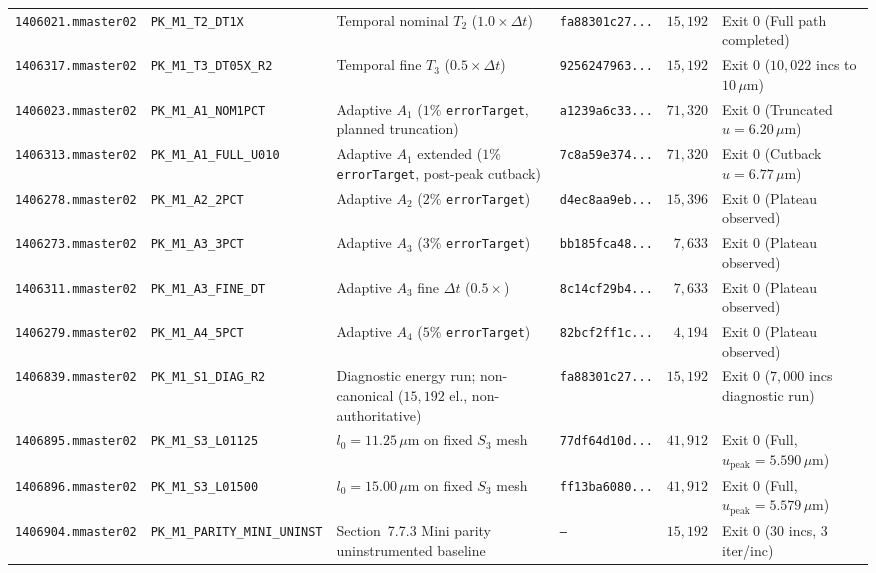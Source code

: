 \begin{table}[htbp]
\begin{tabularx}{\textwidth}{llXlrl}
\texttt{1406021.mmaster02} & \texttt{PK\_M1\_T2\_DT1X} & Temporal nominal $T_2$ ($1.0\times\Delta t$) & \texttt{fa88301c27...} & $15{,}192$ & Exit 0 (Full path completed) \\
\texttt{1406317.mmaster02} & \texttt{PK\_M1\_T3\_DT05X\_R2} & Temporal fine $T_3$ ($0.5\times\Delta t$) & \texttt{9256247963...} & $15{,}192$ & Exit 0 ($10{,}022$ incs to $10\,\mu\text{m}$) \\
\texttt{1406023.mmaster02} & \texttt{PK\_M1\_A1\_NOM1PCT} & Adaptive $A_1$ ($1\%$ \texttt{errorTarget}, planned truncation) & \texttt{a1239a6c33...} & $71{,}320$ & Exit 0 (Truncated $u=6.20\,\mu\text{m}$) \\
\texttt{1406313.mmaster02} & \texttt{PK\_M1\_A1\_FULL\_U010} & Adaptive $A_1$ extended ($1\%$ \texttt{errorTarget}, post-peak cutback) & \texttt{7c8a59e374...} & $71{,}320$ & Exit 0 (Cutback $u=6.77\,\mu\text{m}$) \\
\texttt{1406278.mmaster02} & \texttt{PK\_M1\_A2\_2PCT} & Adaptive $A_2$ ($2\%$ \texttt{errorTarget}) & \texttt{d4ec8aa9eb...} & $15{,}396$ & Exit 0 (Plateau observed) \\
\texttt{1406273.mmaster02} & \texttt{PK\_M1\_A3\_3PCT} & Adaptive $A_3$ ($3\%$ \texttt{errorTarget}) & \texttt{bb185fca48...} & $7{,}633$ & Exit 0 (Plateau observed) \\
\texttt{1406311.mmaster02} & \texttt{PK\_M1\_A3\_FINE\_DT} & Adaptive $A_3$ fine $\Delta t$ ($0.5\times$) & \texttt{8c14cf29b4...} & $7{,}633$ & Exit 0 (Plateau observed) \\
\texttt{1406279.mmaster02} & \texttt{PK\_M1\_A4\_5PCT} & Adaptive $A_4$ ($5\%$ \texttt{errorTarget}) & \texttt{82bcf2ff1c...} & $4{,}194$ & Exit 0 (Plateau observed) \\
\texttt{1406839.mmaster02} & \texttt{PK\_M1\_S1\_DIAG\_R2} & Diagnostic energy run; non-canonical ($15{,}192$ el., non-authoritative) & \texttt{fa88301c27...} & $15{,}192$ & Exit 0 ($7{,}000$ incs diagnostic run) \\
\texttt{1406895.mmaster02} & \texttt{PK\_M1\_S3\_L01125} & $l_0 = 11.25\,\mu\text{m}$ on fixed $S_3$ mesh & \texttt{77df64d10d...} & $41{,}912$ & Exit 0 (Full, $u_{\mathrm{peak}}=5.590\,\mu\text{m}$) \\
\texttt{1406896.mmaster02} & \texttt{PK\_M1\_S3\_L01500} & $l_0 = 15.00\,\mu\text{m}$ on fixed $S_3$ mesh & \texttt{ff13ba6080...} & $41{,}912$ & Exit 0 (Full, $u_{\mathrm{peak}}=5.579\,\mu\text{m}$) \\
\texttt{1406904.mmaster02} & \texttt{PK\_M1\_PARITY\_MINI\_UNINST} & Section~7.7.3 Mini parity uninstrumented baseline & \texttt{---} & $15{,}192$ & Exit 0 (30 incs, 3 iter/inc) \\

\end{tabularx}
\end{table}
